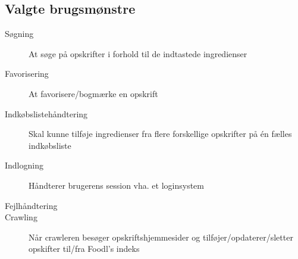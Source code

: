 \subsection{Valgte brugsmønstre}

\begin{description}
  \item[Søgning] At søge på opskrifter i forhold til de indtastede ingredienser

  \item[Favorisering] At favorisere/bogmærke en opskrift

  \item[Indkøbslistehåndtering] Skal kunne tilføje ingredienser fra flere forskellige opskrifter på én fælles indkøbsliste

  \item[Indlogning] Håndterer brugerens session vha. et loginsystem

  \item[Fejlhåndtering]

  \item[Crawling] Når crawleren besøger opskriftshjemmesider og tilføjer/opdaterer/sletter opskifter til/fra Foodl’s indeks
\end{description}


